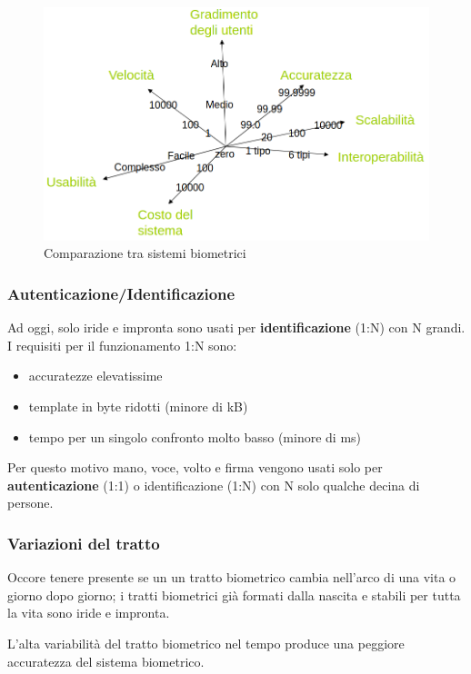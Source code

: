\begin{figure}[h]
    \centering
    \includegraphics[width=0.95\linewidth]{chapters/images-chap1/comparazione.png}
    \caption{Comparazione tra sistemi biometrici}
    \label{fig:comparazione}
\end{figure}

\subsubsection{Autenticazione/Identificazione}

Ad oggi, solo iride e impronta sono usati per \textbf{identificazione} (1:N) con N grandi. I requisiti per il funzionamento 1:N sono:
\begin{itemize}
    \item accuratezze elevatissime
    \item template in byte ridotti (minore di kB)
    \item tempo per un singolo confronto molto basso (minore di ms)
\end{itemize}

\noindent Per questo motivo mano, voce, volto e firma vengono usati solo per \textbf{autenticazione} (1:1) o identificazione (1:N) con N solo qualche decina di persone.

\subsubsection{Variazioni del tratto}

Occore tenere presente se un un tratto biometrico cambia nell'arco di una vita o giorno dopo giorno; i tratti biometrici già formati dalla nascita e stabili per tutta la vita sono iride e impronta.

\noindent L'alta variabilità del tratto biometrico nel tempo produce una peggiore accuratezza del sistema biometrico.

